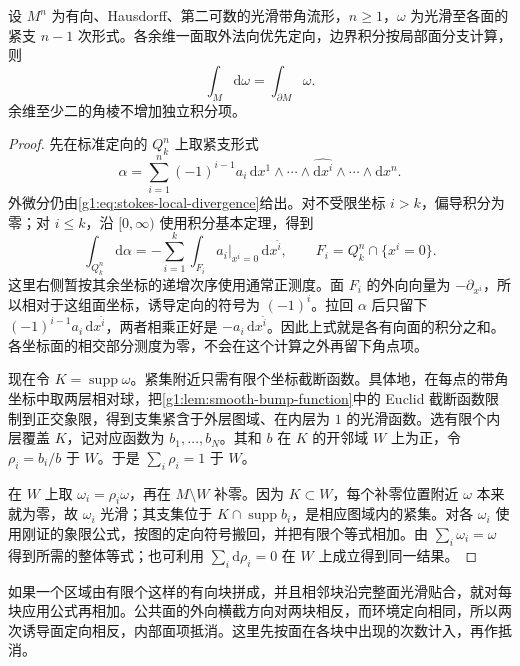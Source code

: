 \begin{theorem}\label{g1:thm:stokes-corners}
	设 \(M^n\) 为有向、Hausdorff、第二可数的光滑带角流形，\(n\ge1\)，\(\omega\) 为光滑至各面的紧支 \(n-1\) 次形式。各余维一面取外法向优先定向，边界积分按局部面分支计算，则
	\[
		\int_M\mathrm{d}\omega=\int_{\partial M}\omega.
	\]
	余维至少二的角棱不增加独立积分项。
\end{theorem}
\begin{proof}
	先在标准定向的 \(Q_k^n\) 上取紧支形式
	\[
		\alpha=\sum_{i=1}^n(-1)^{i-1}a_i\,
		\mathrm{d}x^1\wedge\cdots\wedge\widehat{\mathrm{d}x^i}\wedge\cdots\wedge\mathrm{d}x^n.
	\]
	外微分仍由\eqref{g1:eq:stokes-local-divergence}给出。对不受限坐标 \(i>k\)，偏导积分为零；对 \(i\le k\)，沿 \([0,\infty)\) 使用积分基本定理，得到
	\[
		\int_{Q_k^n}\mathrm{d}\alpha
		=-\sum_{i=1}^k\int_{F_i}a_i|_{x^i=0}\,\mathrm{d}x^{\widehat i},
		\qquad F_i=Q_k^n\cap\{x^i=0\}.
	\]
	这里右侧暂按其余坐标的递增次序使用通常正测度。面 \(F_i\) 的外向向量为 \(-\partial_{x^i}\)，所以相对于这组面坐标，诱导定向的符号为 \((-1)^i\)。拉回 \(\alpha\) 后只留下 \((-1)^{i-1}a_i\,\mathrm{d}x^{\widehat i}\)，两者相乘正好是 \(-a_i\,\mathrm{d}x^{\widehat i}\)。因此上式就是各有向面的积分之和。各坐标面的相交部分测度为零，不会在这个计算之外再留下角点项。

	现在令 \(K=\operatorname{supp}\omega\)。紧集附近只需有限个坐标截断函数。具体地，在每点的带角坐标中取两层相对球，把\cref{g1:lem:smooth-bump-function}中的 Euclid 截断函数限制到正交象限，得到支集紧含于外层图域、在内层为 \(1\) 的光滑函数。选有限个内层覆盖 \(K\)，记对应函数为 \(b_1,\ldots,b_N\)。其和 \(b\) 在 \(K\) 的开邻域 \(W\) 上为正，令 \(\rho_i=b_i/b\) 于 \(W\)。于是 \(\sum_i\rho_i=1\) 于 \(W\)。

	在 \(W\) 上取 \(\omega_i=\rho_i\omega\)，再在 \(M\setminus W\) 补零。因为 \(K\subset W\)，每个补零位置附近 \(\omega\) 本来就为零，故 \(\omega_i\) 光滑；其支集位于 \(K\cap\operatorname{supp}b_i\)，是相应图域内的紧集。对各 \(\omega_i\) 使用刚证的象限公式，按图的定向符号搬回，并把有限个等式相加。由 \(\sum_i\omega_i=\omega\) 得到所需的整体等式；也可利用 \(\sum_i\mathrm{d}\rho_i=0\) 在 \(W\) 上成立得到同一结果。
\end{proof}

如果一个区域由有限个这样的有向块拼成，并且相邻块沿完整面光滑贴合，就对每块应用公式再相加。公共面的外向横截方向对两块相反，而环境定向相同，所以两次诱导面定向相反，内部面项抵消。这里先按面在各块中出现的次数计入，再作抵消。

\ProseParagraphBreak

